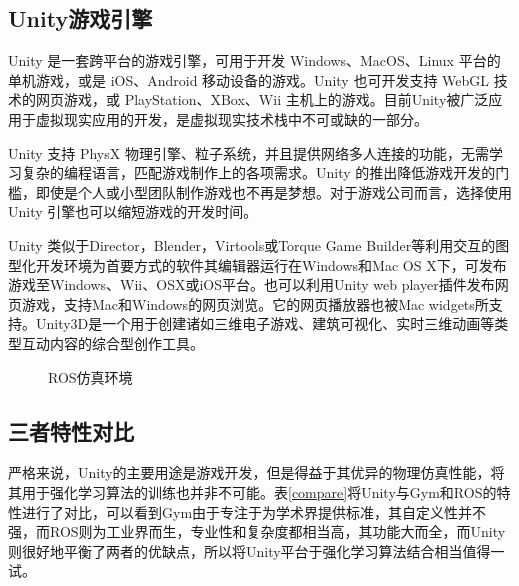 \documentclass[bachelor]{thesis-uestc}
\begin{document}
	\subsection{Unity游戏引擎}
	Unity 是一套跨平台的游戏引擎，可用于开发 Windows、MacOS、Linux 平台的单机游戏，或是 iOS、Android 移动设备的游戏。Unity 也可开发支持 WebGL 技术的网页游戏，或 PlayStation、XBox、Wii 主机上的游戏。目前Unity被广泛应用于虚拟现实应用的开发，是虚拟现实技术栈中不可或缺的一部分。
	
	Unity 支持 PhysX 物理引擎、粒子系统，并且提供网络多人连接的功能，无需学习复杂的编程语言，匹配游戏制作上的各项需求。Unity 的推出降低游戏开发的门槛，即使是个人或小型团队制作游戏也不再是梦想。对于游戏公司而言，选择使用 Unity 引擎也可以缩短游戏的开发时间。
	
	Unity 类似于Director，Blender，Virtools或Torque Game Builder等利用交互的图型化开发环境为首要方式的软件其编辑器运行在Windows和Mac OS X下，可发布游戏至Windows、Wii、OSX或iOS平台。也可以利用Unity web player插件发布网页游戏，支持Mac和Windows的网页浏览。它的网页播放器也被Mac widgets所支持。Unity3D是一个用于创建诸如三维电子游戏、建筑可视化、实时三维动画等类型互动内容的综合型创作工具。
	\begin{figure}[h]
		\centering
		\caption{ROS仿真环境}
	\end{figure}

	\subsection{三者特性对比}
	严格来说，Unity的主要用途是游戏开发，但是得益于其优异的物理仿真性能，将其用于强化学习算法的训练也并非不可能。表\ref{compare}将Unity与Gym和ROS的特性进行了对比，可以看到Gym由于专注于为学术界提供标准，其自定义性并不强，而ROS则为工业界而生，专业性和复杂度都相当高，其功能大而全，而Unity则很好地平衡了两者的优缺点，所以将Unity平台于强化学习算法结合相当值得一试。
	
\end{document}
